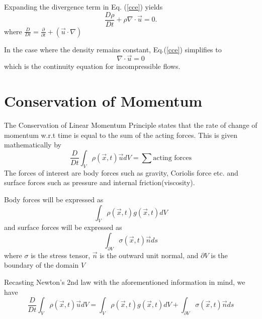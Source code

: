Expanding the divergence term in Eq. (\ref{cce}) yields \begin{equation} \frac{D\rho}{Dt} + \rho \nabla \cdot \stackrel{\rightarrow}{u} = 0. \end{equation} where $\displaystyle{ \frac{D}{Dt} = \frac{\partial}{\partial t} + (\stackrel{\rightarrow}{u}\cdot \nabla)} $

In the case where the density remains constant, Eq.(\ref{cce}) simplifies to \begin{equation}\label{ice} \nabla \cdot \stackrel{\rightarrow}{u} = 0 \end{equation} which is the continuity equation for incompressible flows.

\section{Conservation of Momentum}

The Conservation of Linear Momentum Principle states that the rate of change of momentum w.r.t time is equal to the sum of the acting forces. This is given mathematically by 
\begin{equation}
\frac{D}{Dt}\int_{V} \rho(\stackrel{\rightarrow}{x},t) \stackrel{\rightarrow}{u}dV = \sum \mbox{acting forces}
\end{equation}
 The forces of interest are body forces such as gravity, Coriolis force etc. and surface forces such as pressure and internal friction(viscosity).

Body forces will be expressed as \begin{equation} \int_{V} \rho(\stackrel{\rightarrow}{x},t) g(\stackrel{\rightarrow}{x},t)dV \end{equation} and surface forces will be expressed as \begin{equation} \int_{\partial V} \sigma(\stackrel{\rightarrow}{x},t)\stackrel{\rightarrow}{n}ds \end{equation}
where $\sigma$ is the stress tensor, $\stackrel{\rightarrow}{n}$ is the outward unit normal, and $ \partial V $ is the boundary of the domain $V$

Recasting Newton's 2nd law with the aforementioned information in mind, we have \begin{equation} \frac{D}{Dt} \int_{V} \rho(\stackrel{\rightarrow}{x},t) \stackrel{\rightarrow}{u}dV = \int_{V} \rho(\stackrel{\rightarrow}{x},t) g(\stackrel{\rightarrow}{x},t)dV + \int_{\partial V} \sigma(\stackrel{\rightarrow}{x},t)\stackrel{\rightarrow}{n}ds \end{equation}

